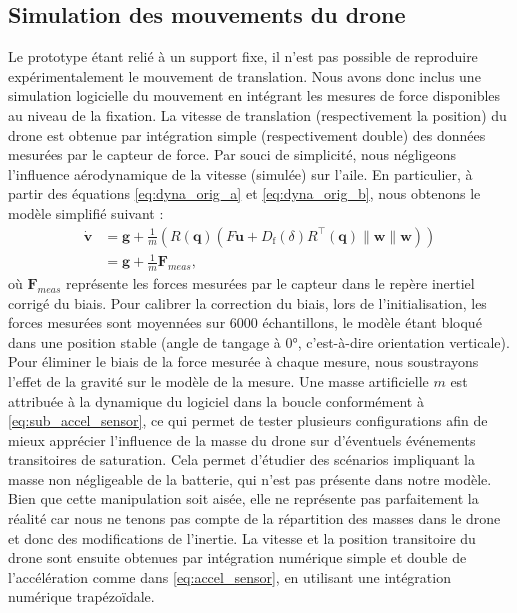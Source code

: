 \subsection{Simulation des mouvements du drone}
Le prototype étant relié à un support fixe, il n'est pas possible de reproduire expérimentalement le mouvement de translation.  Nous avons donc inclus une simulation logicielle du mouvement en intégrant les mesures de force disponibles au niveau de la fixation. La vitesse de translation (respectivement la position) du drone est obtenue par intégration simple (respectivement double) des données mesurées par le capteur de force. Par souci de simplicité, nous négligeons l'influence aérodynamique de la vitesse (simulée) sur l'aile. En particulier, à partir des équations \eqref{eq:dyna_orig_a} et \eqref{eq:dyna_orig_b}, nous obtenons le modèle simplifié suivant : 
\begin{subequations}\label{eq:accel_sensor}
    \begin{align}
        \boldsymbol{\dot v} &= \boldsymbol{g} + \frac{1}{m}\left( R(\boldsymbol{q})(F\boldsymbol{u} +  D_{\text{f}}(\delta) R^\top(\boldsymbol{q})\lVert \boldsymbol{w} \rVert \boldsymbol{w}) \right)\\
        &= \boldsymbol{g} + \frac{1}{m} \boldsymbol{F}_{meas} \label{eq:sub_accel_sensor},
    \end{align}
\end{subequations}
où $\boldsymbol{F}_{meas}$ représente les forces mesurées par le capteur dans le repère inertiel corrigé du biais. Pour calibrer la correction du biais, lors de l'initialisation, les forces mesurées sont moyennées sur 6000 échantillons, le modèle étant bloqué dans une position stable (angle de tangage à 0°, c'est-à-dire orientation verticale). Pour éliminer le biais de la force mesurée à chaque mesure, nous soustrayons l'effet de la gravité sur le modèle de la mesure. Une masse artificielle $m$ est attribuée à la dynamique du logiciel dans la boucle conformément à \eqref{eq:sub_accel_sensor}, ce qui permet de tester plusieurs configurations afin de mieux apprécier l'influence de la masse du drone sur d'éventuels événements transitoires de saturation. Cela permet d'étudier des scénarios impliquant la masse non négligeable de la batterie, qui n'est pas présente dans notre modèle. Bien que cette manipulation soit aisée, elle ne représente pas parfaitement la réalité car nous ne tenons pas compte de la répartition des masses dans le drone et donc des modifications de l'inertie.
La vitesse et la position transitoire du drone sont ensuite obtenues par intégration numérique simple et double de l'accélération comme dans \eqref{eq:accel_sensor}, en utilisant une intégration numérique trapézoïdale.

